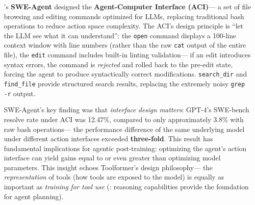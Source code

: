\citet{yang2024sweagent}'s \textbf{SWE-Agent}
designed the \textbf{Agent-Computer Interface (ACI)}---
a set of file browsing and editing commands optimized for LLMs,
replacing traditional bash operations to reduce action space complexity.
The ACI's design principle is ``let the LLM see what it can understand'':
the \texttt{open} command displays a 100-line context window with line numbers (rather than the raw \texttt{cat} output of the entire file),
the \texttt{edit} command includes built-in linting validation---
if an edit introduces syntax errors, the command is \emph{rejected} and rolled back to the pre-edit state,
forcing the agent to produce syntactically correct modifications.
\texttt{search\_dir} and \texttt{find\_file} provide structured search results,
replacing the extremely noisy \texttt{grep -r} output.

SWE-Agent's key finding was that \emph{interface design matters}:
GPT-4's SWE-bench resolve rate under ACI was 12.47\%,
compared to only approximately 3.8\% with raw bash operations---
the performance difference of the same underlying model under different action interfaces exceeded \textbf{three-fold}.
This result has fundamental implications for agentic post-training:
optimizing the agent's action interface can yield gains equal to or even greater than optimizing model parameters.
This insight echoes Toolformer's design philosophy---
the \emph{representation} of tools (how tools are exposed to the model)
is equally as important as \emph{training for tool use}
(: reasoning capabilities provide the foundation for agent planning).

